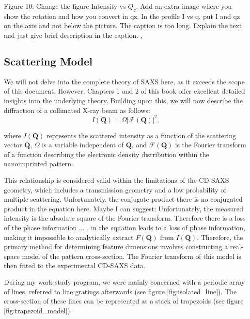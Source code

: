 \color{red} Figure 10: Change the figure Intensity vs $Q_z$. Add an extra image where you show the rotation and how you convert in qz.
In the profile I vs q, put I and qz on the axis and not below the picture. The caption is too long. Explain the text and just give brief description in the caption. \color{black},

\FloatBarrier

\subsection{Scattering Model} \label{sec:scattering_model}

\medskip
We will not delve into the complete theory of SAXS here, as it exceeds the scope of this document. 
However, Chapters 1 and 2 of this book \cite{bookSaxs} offer excellent detailed insights into the underlying 
theory. Building upon this, we will now describe the diffraction of a collimated X-ray beam as follows:
\begin{equation}
    I(\mathbf{Q}) = \varOmega | \mathcal{F}(\mathbf{Q}) |^2,
\end{equation}

where $I(\mathbf{Q})$ represents the scattered intensity as a function of the scattering
vector $\mathbf{Q}$, $\Omega$ is a variable independent of $\mathbf{Q}$,
and $\mathcal{F}(\mathbf{Q})$ is the Fourier transform of a function describing the electronic density
distribution within the nanoimprinted pattern.

This relationship is considered valid within the limitations of the CD-SAXS geometry,
which includes a transmission geometry and a low probability of multiple scattering.
Unfortunately, the conjugate product \color{red} there is no conjugated product in the equation here. Maybe I can suggest: Unfortunately, the measured intensity is the absolute square of the Fourier transform. Therefore there is a loss of the phase information ... \color{black}, in the equation leads to a loss of phase
information, making it impossible to analytically extract $F(\mathbf{Q})$ from $I(\mathbf{Q})$.
Therefore, the primary method for determining feature dimensions involves constructing
a real-space model of the pattern cross-section. The Fourier transform of this 
model is then fitted to the experimental CD-SAXS data.

\medskip

During my work-study program, we were mainly concerned with a periodic array of lines, referred to line gratings afterwards (see figure \ref{fig:isolated_line}). The cross-section of
these lines can be represented as a stack of trapezoids (see figure \ref{fig:trapezoid_model}).


